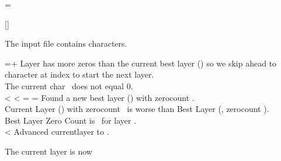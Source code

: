 \documentclass{article} \usepackage[utf8]{inputenc}
\newif\ifcomputationenabled
\begin{document}
\newcount\bestlayer
{}
\newcount\bestlayerzerocount
\bestlayerzerocount=
\newcount\currentlayerzerocount
\newcount\currentlayer

\newcount\digitctr
{} %
%
\newcount\layerafterthelast

\StrLen{\fileline}[\stahp]%

The input file contains  characters.
\ifcomputationenabled

\loop
	\loop
	  \message{\the\digitctr}
	  \advance \digitctr +1
	  \def\currentchar{\strchar{\fileline}{\digitctr}}
\def\res{\ifstrchareq{0}{\currentchar}{0}{1}}
\ifx \res 0
	    \advance \currentlayerzerocount 1
	    Advanced currentlayerzerocount to \the\currentlayerzerocount.\\
	
	    \ifnum \currentlayerzerocount<\inteval{\bestlayerzerocount}
	    \else
	      \digictr={\the\numexpr \layersize * \currentlayer + \layersize}
	Layer \the\currentlayer has more zeros than the current best layer (\the\bestlayer ) so we skip ahead to character at index \digictr to start the next layer.\\
	    \fi
             \else
                The current char \currentchar~does not equal 0.\\
	 \fi
	\ifnum \digitctr<\inteval{\layersize * \currentlayer + \layersize}
	\repeat
	\ifnum \currentlayerzerocount<\bestlayerzerocount
	  \bestlayer=\currentlayer
	  \bestlayerzerocount=\currentlayerzerocount
             Found a new best layer (\the\bestlayer) with zerocount \the\bestlayerzerocount.\\
          \else
             Current Layer (\the\currentlayer) with zerocount \the\currentlayerzerocount~is worse than Best Layer (\the\bestlayer, zerocount \the\bestlayerzerocount).\\
	\fi
          Best Layer Zero Count is \the\bestlayerzerocount~for layer \the\bestlayer. \\
\ifnum \digitctr<\stahp
	\advance {}
	Advanced currentlayer to \the\currentlayer.\\
\repeat

The current layer is now \the\currentlayer

\fi
\end{document}
